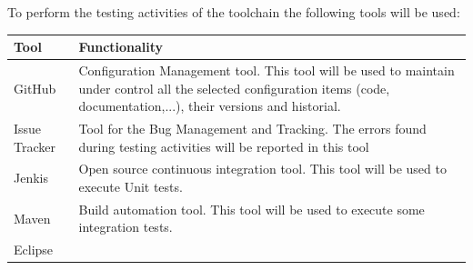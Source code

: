 To perform the testing activities of the toolchain the following tools will be used:

\begin{center}
\begin{longtable}{|p{2cm}|p{8cm}|}\hline
\textbf{Tool} & \textbf{Functionality}\\\hline
GitHub & Configuration Management tool. This tool will be used to maintain under control all the selected configuration items (code, documentation,...), their versions and historial.\\\hline
Issue Tracker & Tool for the Bug Management and Tracking. The errors found during testing activities will be reported in this tool\\\hline
Jenkis & Open source continuous integration tool. This tool will be used to execute Unit tests.\\\hline
Maven &  Build automation tool. This tool will be used to execute some integration tests.\\\hline
Eclipse & \\\hline
\end{longtable}
\end{center}


